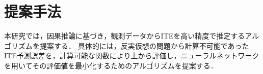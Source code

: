 \documentclass[dvipdfmx]{jreport}
\begin{document}
\section{提案手法}
本研究では，因果推論に基づき，観測データからITEを高い精度で推定するアルゴリズムを提案する．
具体的には，反実仮想の問題から計算不可能であったITE予測誤差を，計算可能な関数により上から評価し，ニューラルネットワークを用いてその評価値を最小化するためのアルゴリズムを提案する．
\end{document}
